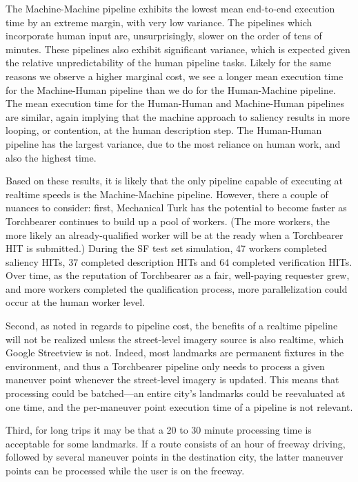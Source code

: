 The Machine-Machine pipeline exhibits the lowest mean end-to-end execution time by an extreme margin, with very low variance. The pipelines which incorporate human input are, unsurprisingly, slower on the order of tens of minutes. These pipelines also exhibit significant variance, which is expected given the relative unpredictability of the human pipeline tasks. Likely for the same reasons we observe a higher marginal cost, we see a longer mean execution time for the Machine-Human pipeline than we do for the Human-Machine pipeline. The mean execution time for the Human-Human and Machine-Human pipelines are similar, again implying that the machine approach to saliency results in more looping, or contention, at the human description step. The Human-Human pipeline has the largest variance, due to the most reliance on human work, and also the highest time. 

Based on these results, it is likely that the only pipeline capable of executing at realtime speeds is the Machine-Machine pipeline. However, there a couple of nuances to consider: first, Mechanical Turk has the potential to become faster as Torchbearer continues to build up a pool of workers. (The more workers, the more likely an already-qualified worker will be at the ready when a Torchbearer HIT is submitted.) During the SF test set simulation, 47 workers completed saliency HITs, 37 completed description HITs and 64 completed verification HITs. Over time, as the reputation of Torchbearer as a fair, well-paying requester grew, and more workers completed the qualification process, more parallelization could occur at the human worker level.

Second, as noted in regards to pipeline cost, the benefits of a realtime pipeline will not be realized unless the street-level imagery source is also realtime, which Google Streetview is not. Indeed, most landmarks are permanent fixtures in the environment, and thus a Torchbearer pipeline only needs to process a given maneuver point whenever the street-level imagery is updated. This means that processing could be batched---an entire city's landmarks could be reevaluated at one time, and the per-maneuver point execution time of a pipeline is not relevant.

Third, for long trips it may be that a 20 to 30 minute processing time is acceptable for some landmarks. If a route consists of an hour of freeway driving, followed by several maneuver points in the destination city, the latter maneuver points can be processed while the user is on the freeway.

